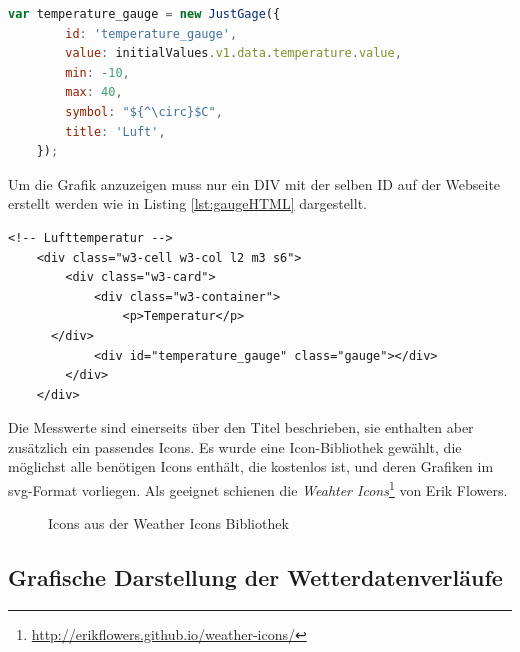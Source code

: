 \begin{lstlisting}[label=lst:gaugeJS,caption=Konfiguration der Gauge, language=JavaScript,mathescape, style=htmlcssjs]
    var temperature_gauge = new JustGage({
        id: 'temperature_gauge',
        value: initialValues.v1.data.temperature.value,
        min: -10,
        max: 40,
        symbol: "${^\circ}$C",
        title: 'Luft',
    });
\end{lstlisting}

Um die Grafik anzuzeigen muss nur ein DIV mit der selben ID auf der Webseite erstellt werden wie in Listing \ref{lst:gaugeHTML} dargestellt.

\begin{lstlisting}[label=lst:gaugeHTML,caption=Container für die SVG-Grafik (Gauge), language=HTML5, style=htmlcssjs]
	<!-- Lufttemperatur -->
	<div class="w3-cell w3-col l2 m3 s6">
		<div class="w3-card">
			<div class="w3-container">
        		<p>Temperatur</p>
      </div>
			<div id="temperature_gauge" class="gauge"></div>
		</div>
	</div>
\end{lstlisting}

Die Messwerte sind einerseits über den Titel beschrieben, sie enthalten aber zusätzlich ein passendes Icons. Es wurde eine Icon-Bibliothek gewählt, die möglichst alle benötigen Icons enthält, die kostenlos ist, und deren Grafiken im svg-Format vorliegen. Als geeignet schienen die \textit{Weahter Icons}\footnote{\url{http://erikflowers.github.io/weather-icons/}} von Erik Flowers.


\begin{figure}[h!]
	\centering
	\caption{Icons aus der Weather Icons Bibliothek}
	\label{img:icons}
\end{figure}





\subsection{Grafische Darstellung der Wetterdatenverläufe}
\newline
{}\newline
{}\newline
{}\newline
{}\newline
{}\newline

